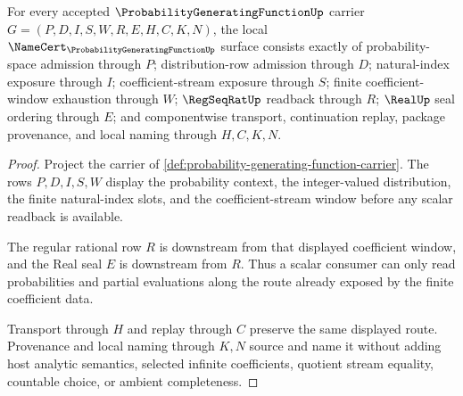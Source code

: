 \begin{theorem}
\label{thm:probability-generating-function-namecert-obligations}
For every accepted $\ProbabilityGeneratingFunctionUp$ carrier $G=(P,D,I,S,W,R,E,H,C,K,N)$, the local $\NameCert_{\ProbabilityGeneratingFunctionUp}$ surface consists exactly of probability-space admission through $P$; distribution-row admission through $D$; natural-index exposure through $I$; coefficient-stream exposure through $S$; finite coefficient-window exhaustion through $W$; $\RegSeqRatUp$ readback through $R$; $\RealUp$ seal ordering through $E$; and componentwise transport, continuation replay, package provenance, and local naming through $H,C,K,N$.
\end{theorem}
\begin{proof}
Project the carrier of \autoref{def:probability-generating-function-carrier}. The rows $P,D,I,S,W$ display the probability context, the integer-valued distribution, the finite natural-index slots, and the coefficient-stream window before any scalar readback is available.

The regular rational row $R$ is downstream from that displayed coefficient window, and the Real seal $E$ is downstream from $R$. Thus a scalar consumer can only read probabilities and partial evaluations along the route already exposed by the finite coefficient data.

Transport through $H$ and replay through $C$ preserve the same displayed route. Provenance and local naming through $K,N$ source and name it without adding host analytic semantics, selected infinite coefficients, quotient stream equality, countable choice, or ambient completeness.
\end{proof}

